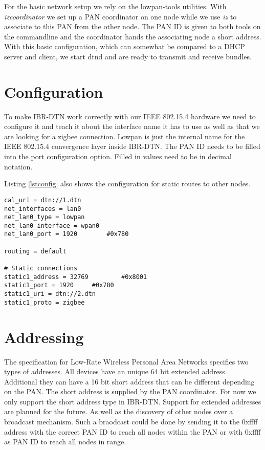 For the basic network setup we rely on the lowpan-tools utilities. With
\emph{izcoordinator} we set up a PAN coordinator on one
node while we use \emph{iz} to associate to this PAN from the other node. The PAN ID is
given to both tools on the commandline and the coordinator hands the
associating node a short address. With this basic configuration, which can
somewhat be compared to a DHCP server and client, we start dtnd and are ready to
transmit and receive bundles.

\section{Configuration}

To make IBR-DTN work correctly with our IEEE 802.15.4 hardware we need to configure
it and teach it about the interface name it has to use as well as that we are
looking for a zigbee connection. Lowpan is just the internal name for the
IEEE 802.15.4 convergence layer inside IBR-DTN. The PAN ID needs to be filled into the
port configuration option. Filled in values need to be in decimal notation.

Listing \ref{lstconfig} also shows the configuration for static routes to other
nodes.

\begin{lstlisting}[caption= dtnd example configuration, label=lstconfig]
cal_uri = dtn://1.dtn
net_interfaces = lan0
net_lan0_type = lowpan
net_lan0_interface = wpan0
net_lan0_port = 1920		#0x780

routing = default

# Static connections
static1_address = 32769         #0x8001
static1_port = 1920		#0x780
static1_uri = dtn://2.dtn
static1_proto = zigbee
\end{lstlisting}

\section{Addressing}

The specification for Low-Rate Wireless Personal Area Networks specifies two
types of addresses. All devices have an unique 64 bit extended address.
Additional they can have a 16 bit short address that can be different depending
on the PAN. The short address is supplied by the PAN coordinator. For now we
only support the short address type in IBR-DTN. Support for extended addresses
are planned for the future. As well as the discovery of other nodes over a
broadcast mechanism. Such a braodcast could be done by sending it to the 0xffff
address with the correct PAN ID to reach all nodes within the PAN or with 0xffff
as PAN ID to reach all nodes in range.

